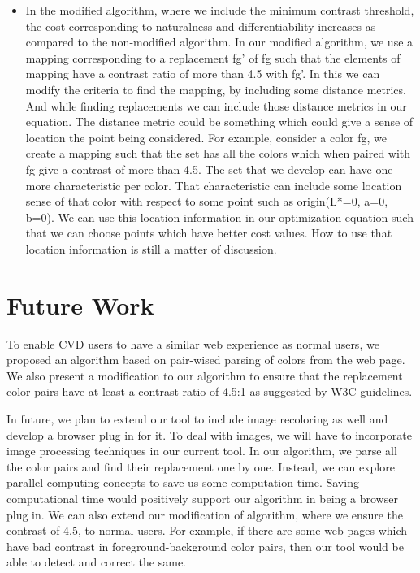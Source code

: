 \begin{itemize}
\item{}In the modified algorithm, where we include the minimum contrast threshold, the cost corresponding to naturalness and differentiability increases as compared to the non-modified algorithm. In our modified algorithm, we use a mapping corresponding to a replacement fg’ of fg such that the elements of mapping have a contrast ratio of more than 4.5 with fg’. In this we can modify the criteria to find the mapping, by including some distance metrics. And while finding replacements we can include those distance metrics in our equation. The distance metric could be something which could give a sense of location the point being considered. For example, consider a color fg, we create a mapping such that the set has all the colors which when paired with fg give a contrast of more than 4.5. The set that we develop can have one more characteristic per color. That characteristic can include some location sense of that color with respect to some point such as origin(L*=0, a=0, b=0). We can use this location information in our optimization equation such that we can choose points which have better cost values. How to use that location information is still a matter of discussion. 

\end{itemize}

\section{Future Work} %
\label{sec:future_work}


To enable CVD users to have a similar web experience as normal users, we proposed an algorithm based on pair-wised parsing of colors from the web page. We also present a modification to our algorithm to ensure that the replacement color pairs have at least a contrast ratio of 4.5:1 as suggested by W3C guidelines.

In future, we plan to extend our tool to include image recoloring as well and develop a browser plug in for it. To deal with images, we will have to incorporate image processing techniques in our current tool. In our algorithm, we parse all the color pairs and find their replacement one by one. Instead, we can explore parallel computing concepts to save us some computation time. Saving computational time would positively support our algorithm in being a browser plug in. We can also extend our modification of algorithm, where we ensure the contrast of 4.5, to normal users. For example, if there are some web pages which have bad contrast in foreground-background color pairs, then our tool would be able to detect and correct the same.   